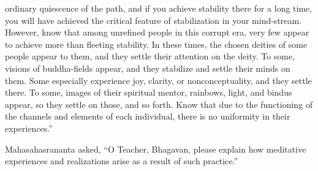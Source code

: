 \documentclass[a4paper,11pt,twoside,final]{book}
\begin{document}
ordinary quiescence of the path, and if you achieve stability there
for a long time, you will have achieved the critical feature of
stabilization in your mind-stream. However, know that among unrefined
people in this corrupt era, very few appear to achieve more than
fleeting stability. In these times, the chosen deities of some people
appear to them, and they settle their attention on the deity. To some,
visions of buddha-fields appear, and they stabilize and settle their
minds on them. Some especially experience joy, clarity, or
nonconceptuality, and they settle there. To some, images of their
spiritual mentor, rainbows, light, and bindus appear, so they settle
on those, and so forth. Know that due to the functioning of the
channels and elements of each individual, there is no uniformity in
their experiences.''

Mahasahasrananta asked, ``O Teacher, Bhagavan, please explain how
meditative experiences and realizations arise as a result of such
practice.''
\end{document}
